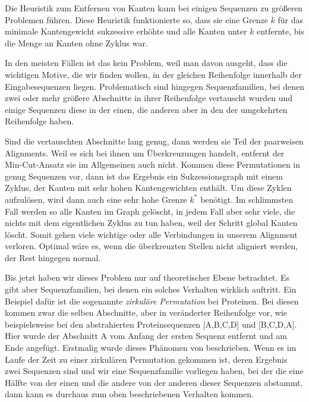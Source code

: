 Die Heuristik zum Entfernen von Kanten kann bei einigen Sequenzen zu größeren Problemen führen. Diese Heuristik funktionierte so, dass sie eine Grenze $k$ für das minimale Kantengewicht sukzessive erhöhte und alle Kanten unter $k$ entfernte, bis die Menge an Kanten ohne Zyklus war. 

In den meisten Fällen ist das kein Problem, weil man davon ausgeht, dass die wichtigen Motive, die wir finden wollen, in der gleichen Reihenfolge innerhalb der Eingabesequenzen liegen. Problematisch sind hingegen Sequenzfamilien, bei denen zwei oder mehr größere Abschnitte in ihrer Reihenfolge vertauscht wurden und einige Sequenzen diese in der einen, die anderen aber in den der umgekehrten Reihenfolge haben.

Sind die vertauschten Abschnitte lang genug, dann werden sie Teil der paarweisen Alignments. Weil es sich bei ihnen um Überkreuzungen handelt, entfernt der Min-Cut-Ansatz sie im Allgemeinen auch nicht. Kommen diese Permutationen in genug Sequenzen vor, dann ist das Ergebnis ein Sukzessionsgraph mit einem Zyklus, der Kanten mit sehr hohen Kantengewichten enthält. Um diese Zyklen aufzulösen, wird dann auch eine sehr hohe Grenze $k^{*}$ benötigt. Im schlimmsten Fall werden so alle Kanten im Graph gelöscht, in jedem Fall aber sehr viele, die nichts mit dem eigentlichen Zyklus zu tun haben, weil der Schritt global Kanten löscht. Somit gehen viele wichtige oder alle Verbindungen in unserem Alignment verloren. Optimal wäre es, wenn die überkreuzten Stellen nicht aligniert werden, der Rest hingegen normal.

Bis jetzt haben wir dieses Problem nur auf theoretischer Ebene betrachtet. Es gibt aber Sequenzfamilien, bei denen ein solches Verhalten wirklich auftritt. Ein Beispiel dafür ist die sogenannte \emph{zirkuläre Permutation} bei Proteinen. Bei diesen kommen zwar die selben Abschnitte, aber in veränderter Reihenfolge vor, wie beispielsweise bei den abstrahierten Proteinsequenzen [A,B,C,D] und [B,C,D,A]. Hier wurde der Abschnitt A vom Anfang der ersten Sequenz entfernt und am Ende angefügt. Erstmalig wurde dieses Phänomen von \cite{chhe79} beschrieben. Wenn es im Laufe der Zeit zu einer zirkulären Permutation gekommen ist, deren Ergebnis zwei Sequenzen sind und wir eine Sequenzfamilie vorliegen haben, bei der die eine Hälfte von der einen und die andere von der anderen dieser Sequenzen abstammt, dann kann es durchaus zum oben beschriebenen Verhalten kommen.

